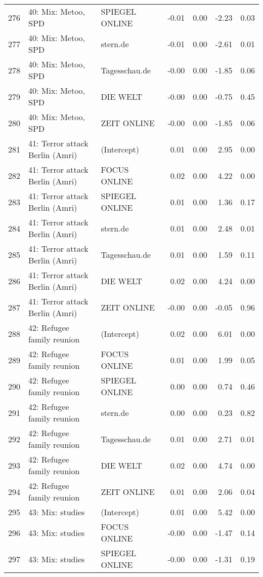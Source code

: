 \begin{table}[ht]
{\begin{tabular}{rllrrrr}
  276 & 40: Mix: Metoo, SPD & SPIEGEL ONLINE & -0.01 & 0.00 & -2.23 & 0.03 \\ 
  277 & 40: Mix: Metoo, SPD & stern.de & -0.01 & 0.00 & -2.61 & 0.01 \\ 
  278 & 40: Mix: Metoo, SPD & Tagesschau.de & -0.00 & 0.00 & -1.85 & 0.06 \\ 
  279 & 40: Mix: Metoo, SPD & DIE WELT & -0.00 & 0.00 & -0.75 & 0.45 \\ 
  280 & 40: Mix: Metoo, SPD & ZEIT ONLINE & -0.00 & 0.00 & -1.85 & 0.06 \\ 
  281 & 41: Terror attack Berlin (Amri) & (Intercept) & 0.01 & 0.00 & 2.95 & 0.00 \\ 
  282 & 41: Terror attack Berlin (Amri) & FOCUS ONLINE & 0.02 & 0.00 & 4.22 & 0.00 \\ 
  283 & 41: Terror attack Berlin (Amri) & SPIEGEL ONLINE & 0.01 & 0.00 & 1.36 & 0.17 \\ 
  284 & 41: Terror attack Berlin (Amri) & stern.de & 0.01 & 0.00 & 2.48 & 0.01 \\ 
  285 & 41: Terror attack Berlin (Amri) & Tagesschau.de & 0.01 & 0.00 & 1.59 & 0.11 \\ 
  286 & 41: Terror attack Berlin (Amri) & DIE WELT & 0.02 & 0.00 & 4.24 & 0.00 \\ 
  287 & 41: Terror attack Berlin (Amri) & ZEIT ONLINE & -0.00 & 0.00 & -0.05 & 0.96 \\ 
  288 & 42: Refugee family reunion & (Intercept) & 0.02 & 0.00 & 6.01 & 0.00 \\ 
  289 & 42: Refugee family reunion & FOCUS ONLINE & 0.01 & 0.00 & 1.99 & 0.05 \\ 
  290 & 42: Refugee family reunion & SPIEGEL ONLINE & 0.00 & 0.00 & 0.74 & 0.46 \\ 
  291 & 42: Refugee family reunion & stern.de & 0.00 & 0.00 & 0.23 & 0.82 \\ 
  292 & 42: Refugee family reunion & Tagesschau.de & 0.01 & 0.00 & 2.71 & 0.01 \\ 
  293 & 42: Refugee family reunion & DIE WELT & 0.02 & 0.00 & 4.74 & 0.00 \\ 
  294 & 42: Refugee family reunion & ZEIT ONLINE & 0.01 & 0.00 & 2.06 & 0.04 \\ 
  295 & 43: Mix: studies & (Intercept) & 0.01 & 0.00 & 5.42 & 0.00 \\ 
  296 & 43: Mix: studies & FOCUS ONLINE & -0.00 & 0.00 & -1.47 & 0.14 \\ 
  297 & 43: Mix: studies & SPIEGEL ONLINE & -0.00 & 0.00 & -1.31 & 0.19 \\ 

\end{tabular}}
\end{table}
